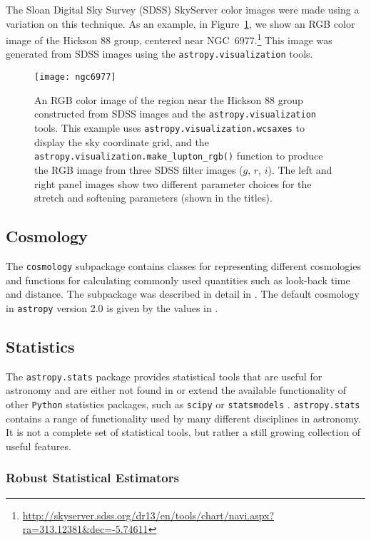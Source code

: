 \documentclass[modern]{aastex62}
\newcommand{\package}[1]{\texttt{#1}\xspace}
\newcommand{\python}{\package{Python}}
\newcommand{\astropypkg}{\package{astropy}}
\renewcommand{\figurename}{Figure\xspace}
\begin{document}
The Sloan Digital Sky Survey (SDSS) SkyServer color images were made using a
variation on this technique.  As an example, in \figurename~\ref{fig:ngc6977},
we show an RGB color image of the Hickson 88 group, centered near
NGC~6977.\footnote{\url{http://skyserver.sdss.org/dr13/en/tools/chart/navi.aspx?ra=313.12381&dec=-5.74611}}
This image was generated from SDSS images using the
\package{astropy.visualization} tools.

\begin{figure}
\texttt{[image: ngc6977]}
\caption{An RGB color image of the region near the Hickson 88 group
constructed from SDSS images and the \package{astropy.visualization}
tools.
This example uses \package{astropy.visualization.wcsaxes} to display the
sky coordinate grid, and the \texttt{astropy.visualization.make\_lupton\_rgb()}
function to produce the RGB image from three SDSS filter images ($g$, $r$, $i$).
The left and right panel images show two different parameter choices for the
stretch and softening parameters (shown in the titles).
\label{fig:ngc6977}}
\end{figure}


\subsection{Cosmology}

The \package{cosmology} subpackage contains classes for representing different
cosmologies and functions for calculating commonly used quantities such as
look-back time and distance.   The subpackage was described in detail in
\cite{astropy}.  The default cosmology in \astropypkg version 2.0 is given by
the values in \cite{2016A&A...594A..13P}.

\subsection{Statistics}

The \package{astropy.stats} package provides statistical tools that
are useful for astronomy and are either not found in or extend
the available functionality of other \python statistics packages, such
as \package{scipy} \citep{scipy} or \package{statsmodels}
\citep{seabold2010statsmodels}.  \package{astropy.stats} contains
a range of functionality used by many different disciplines
in astronomy. It is not a complete set of statistical tools, but rather
a still growing collection of useful features.


\subsubsection{Robust Statistical Estimators}
\end{document}
